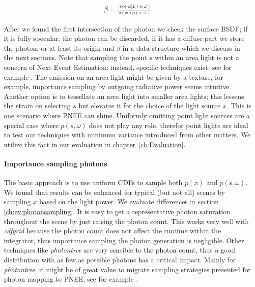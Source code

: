 \begin{align}\label{eq:beta}
\beta = \frac{|\cos{\omega}|L(\text{s}, \omega)}{p(x)p(\text{s}, \omega)}
\end{align}

 After we found the first intersection of the photon we check the surface BSDF; if it is fully specular, the photon can be discarded, if it has a diffuse part we store the photon, or at least its origin and $\beta$ in a data structure which we discuss in the next sections. Note that sampling the point $s$ within an area light is not a concern of Next Event Estimation; instead, specific techniques exist, see for example \parencite{Shirley:1996:MCT:226150.226151, DBLP:journals/cgf/UrenaFK13, DBLP:journals/corr/abs-1805-09048, DBLP:journals/cgf/KokJ92}. The emission on an area light might be given by a texture, for example, importance sampling by outgoing radiative power seems intuitive. Another option is to tessellate an area light into smaller area lights; this lessens the strain on selecting $s$ but elevates it for the choice of the light source $x$. This is one scenario where PNEE can shine. Uniformly omitting point light sources are a special case where $p(s,\omega)$ does not play any role, therefor point lights are ideal to test our techniques with minimum variance introduced from other matters. We utilize this fact in our evaluation in chapter~\ref{ch:Evaluation}.

\paragraph{Importance sampling photons}
\label{ch:photonimportancesample}

The basic approach is to use uniform CDFs to sample both $p(x)$ and $p(\text{s}, \omega)$. We found that results can be enhanced for typical (but not all) scenes by sampling $x$ based on the light power. We evaluate differences in section \ref{ch:ev:photonsampling}. It is easy to get a representative photon saturation throughout the scene by just raising the photon count. This works very well with \textit{cdfgrid} because the photon count does not affect the runtime within the integrator, thus importance sampling the photon generation is negligible. Other techniques like \textit{photontree} are very sensible to the photon count, thus a good distribution with as few as possible photons has a critical impact. Mainly for \textit{photontree}, it might be of great value to migrate sampling strategies presented for photon mapping to PNEE, see for example \parencite{DBLP:conf/rt/PeterP98, DBLP:conf/rt/SuykensW00, DBLP:journals/vc/ZhengZ15}.

